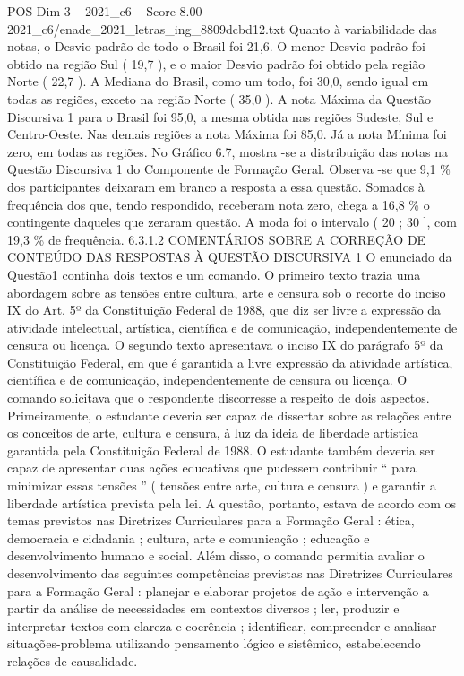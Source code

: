 \begin{textsample}{POS Dim 3 – 2021\_c6 – Score 8.00 – 2021\_c6/enade\_2021\_letras\_ing\_8809dcbd12.txt}
Quanto à variabilidade das notas, o Desvio padrão de todo o Brasil foi 21,6.
O menor Desvio padrão foi obtido na região Sul ( 19,7 ), e o maior Desvio padrão foi obtido pela região Norte ( 22,7 ).
A Mediana do Brasil, como um todo, foi 30,0, sendo igual em todas as regiões, exceto na região Norte ( 35,0 ).
A nota Máxima da Questão Discursiva 1 para o Brasil foi 95,0, a mesma obtida nas regiões Sudeste, Sul e Centro-Oeste.
Nas demais regiões a nota Máxima foi 85,0.
Já a nota Mínima foi zero, em todas as regiões.
No Gráfico 6.7, mostra -se a distribuição das notas na Questão Discursiva 1 do Componente de Formação Geral.
Observa -se que 9,1 \% dos participantes deixaram em branco a resposta a essa questão.
Somados à frequência dos que, tendo respondido, receberam nota zero, chega a 16,8 \% o contingente daqueles que zeraram questão.
A moda foi o intervalo ( 20 ; 30 ], com 19,3 \% de frequência. 6.3.1.2 COMENTÁRIOS SOBRE A CORREÇÃO DE CONTEÚDO DAS RESPOSTAS À QUESTÃO DISCURSIVA 1 O enunciado da Questão1 continha dois textos e um comando.
O primeiro texto trazia uma abordagem sobre as tensões entre cultura, arte e censura sob o recorte do inciso IX do Art. 5º da Constituição Federal de 1988, que diz ser livre a expressão da atividade intelectual, artística, científica e de comunicação, independentemente de censura ou licença.
O segundo texto apresentava o inciso IX do parágrafo 5º da Constituição Federal, em que é garantida a livre expressão da atividade artística, científica e de comunicação, independentemente de censura ou licença.
O comando solicitava que o respondente discorresse a respeito de dois aspectos.
Primeiramente, o estudante deveria ser capaz de dissertar sobre as relações entre os conceitos de arte, cultura e censura, à luz da ideia de liberdade artística garantida pela Constituição Federal de 1988.
O estudante também deveria ser capaz de apresentar duas ações educativas que pudessem contribuir “ para minimizar essas tensões ” ( tensões entre arte, cultura e censura ) e garantir a liberdade artística prevista pela lei.
A questão, portanto, estava de acordo com os temas previstos nas Diretrizes Curriculares para a Formação Geral : ética, democracia e cidadania ; cultura, arte e comunicação ; educação e desenvolvimento humano e social.
Além disso, o comando permitia avaliar o desenvolvimento das seguintes competências previstas nas Diretrizes Curriculares para a Formação Geral : planejar e elaborar projetos de ação e intervenção a partir da análise de necessidades em contextos diversos ; ler, produzir e interpretar textos com clareza e coerência ; identificar, compreender e analisar situações-problema utilizando pensamento lógico e sistêmico, estabelecendo relações de causalidade.

\end{textsample}
